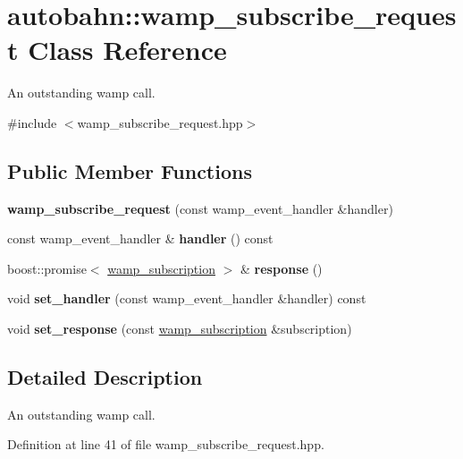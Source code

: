 \hypertarget{classautobahn_1_1wamp__subscribe__request}{}\section{autobahn\+:\+:wamp\+\_\+subscribe\+\_\+request Class Reference}
\label{classautobahn_1_1wamp__subscribe__request}


An outstanding wamp call.  




{\ttfamily \#include $<$wamp\+\_\+subscribe\+\_\+request.\+hpp$>$}

\subsection*{Public Member Functions}
\begin{DoxyCompactItemize}
\item 
{\bfseries wamp\+\_\+subscribe\+\_\+request} (const wamp\+\_\+event\+\_\+handler \&handler)\hypertarget{classautobahn_1_1wamp__subscribe__request_a240cc9e38147c44e6e7b7cb003a60fd8}{}\label{classautobahn_1_1wamp__subscribe__request_a240cc9e38147c44e6e7b7cb003a60fd8}

\item 
const wamp\+\_\+event\+\_\+handler \& {\bfseries handler} () const \hypertarget{classautobahn_1_1wamp__subscribe__request_a6b2f2ecb127a6b9ab4c997106887c695}{}\label{classautobahn_1_1wamp__subscribe__request_a6b2f2ecb127a6b9ab4c997106887c695}

\item 
boost\+::promise$<$ \hyperlink{classautobahn_1_1wamp__subscription}{wamp\+\_\+subscription} $>$ \& {\bfseries response} ()\hypertarget{classautobahn_1_1wamp__subscribe__request_afcf89c5ab1130cf19440dd3e699641bf}{}\label{classautobahn_1_1wamp__subscribe__request_afcf89c5ab1130cf19440dd3e699641bf}

\item 
void {\bfseries set\+\_\+handler} (const wamp\+\_\+event\+\_\+handler \&handler) const \hypertarget{classautobahn_1_1wamp__subscribe__request_ae4c59e370b322d879526623654e79c86}{}\label{classautobahn_1_1wamp__subscribe__request_ae4c59e370b322d879526623654e79c86}

\item 
void {\bfseries set\+\_\+response} (const \hyperlink{classautobahn_1_1wamp__subscription}{wamp\+\_\+subscription} \&subscription)\hypertarget{classautobahn_1_1wamp__subscribe__request_a82f5364cdefde46d0003a6a3ab4c5e37}{}\label{classautobahn_1_1wamp__subscribe__request_a82f5364cdefde46d0003a6a3ab4c5e37}

\end{DoxyCompactItemize}


\subsection{Detailed Description}
An outstanding wamp call. 

Definition at line 41 of file wamp\+\_\+subscribe\+\_\+request.\+hpp.

